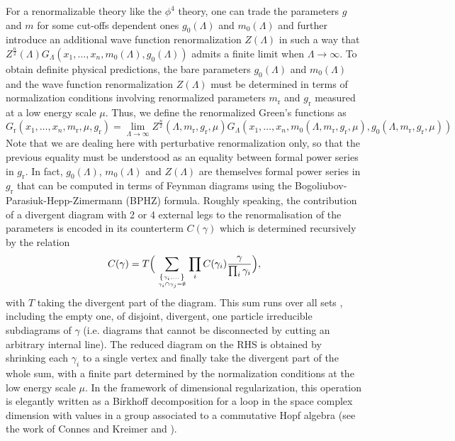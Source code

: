 \documentclass[10pt,here,feynmf]{article}
\begin{document}
For a renormalizable theory like the $\phi^{4}$ theory, one can trade the parameters $g$ and $m$ for some cut-offs dependent ones $g_{0}(\Lambda)$ and $m_{0}(\Lambda)$ and further introduce an additional wave function renormalization $Z(\Lambda)$ in such a way that $Z^{\frac{n}{2}}(\Lambda)G_{\Lambda}(x_{1},\dots,x_{n},m_{0}(\Lambda), g_{0}(\Lambda))$ admits a finite limit when $\Lambda\rightarrow\infty$. To obtain definite physical predictions, the bare parameters $g_{0}(\Lambda)$ and $m_{0}(\Lambda)$ and the wave function renormalization $Z(\Lambda)$ must be determined in terms of  normalization conditions involving renormalized parameters $m_{\mathrm{r}}$ and $g_{\mathrm{r}}$ measured at a low energy scale $\mu$. Thus, we define the renormalized Green's functions as
\begin{equation}
G_{\mathrm{r}}(x_{1},\dots,x_{n},m_{\mathrm{r}},\mu, g_{\mathrm{r}})=\lim_{\Lambda\rightarrow\infty}Z^{\frac{n}{2}}(\Lambda,m_{\mathrm{r}}, g_{\mathrm{r}},\mu)G_{\Lambda}(x_{1},\dots,x_{n},m_{0}(\Lambda,m_{\mathrm{r}}, g_{\mathrm{r}},\mu), g_{0}(\Lambda,m_{\mathrm{r}}, g_{\mathrm{r}},\mu))
\end{equation}
Note that we are dealing here with perturbative renormalization only, so that the previous equality must be understood as an equality between formal power series in $g_{\mathrm{r}}$. In fact, $g_{0}(\Lambda)$, $m_{0}(\Lambda)$ and $Z(\Lambda)$ are themselves formal power series in $g_{\mathrm{r}}$ that can be computed in terms of Feynman diagrams using the Bogoliubov-Parasiuk-Hepp-Zimermann (BPHZ) formula. Roughly speaking, the contribution of a divergent diagram with 2 or 4 external legs to the renormalisation of the parameters is encoded in its counterterm $C(\gamma)$ which is determined recursively by the relation
\begin{equation} 
C(\gamma)=T\Big(\sum_{\left\{\gamma_{i},\dots\right\}\atop \gamma_{i}\cap\gamma_{j}=\emptyset}\prod_{i}C(\gamma_{i})
\frac{\gamma}{\prod_{i}\gamma_{i}}\Big),
\end{equation}
with $T$ taking the divergent part of the diagram. This sum runs over all sets , including the empty one, of disjoint, divergent, one particle irreducible subdiagrams of $\gamma$ (i.e. diagrams that cannot be disconnected by cutting an arbitrary internal line). The reduced diagram on the RHS is obtained by shrinking each $\gamma_{i}$ to a single vertex and finally take the divergent part of the whole sum, with a finite part determined by the normalization conditions at the low energy scale $\mu$. In the framework of dimensional regularization, this operation is elegantly written as a Birkhoff decomposition for a loop in the space complex dimension with values in a group associated to a commutative Hopf  algebra (see 
the work of Connes and Kreimer \cite{ck1} and \cite{ck2}).
\end{document}
